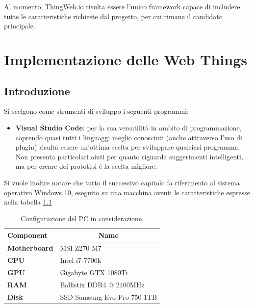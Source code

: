 \documentclass[12pt,a4paper,openright,oneside]{report}
\begin{document}
Al momento, ThingWeb.io risulta essere l'unico framework capace di includere tutte le caratteristiche richieste dal progetto, per cui rimane il candidato principale.


\clearpage{\pagestyle{empty}\cleardoublepage}
\chapter{Implementazione delle Web Things}           %
\lhead[\fancyplain{}{\bfseries\thepage}]{\fancyplain{}{\bfseries\rightmark}}  

\section{Introduzione}

Si scelgono come strumenti di sviluppo i seguenti programmi:

\begin{itemize}
	\item \textbf{Visual Studio Code}: per la sua versatilità in ambito di programmazione, coprendo quasi tutti i linguaggi meglio conosciuti (anche attraverso l'uso di plugin) risulta essere un'ottima scelta per sviluppare qualsiasi programma. Non presenta particolari aiuti per quanto riguarda suggerimenti intelligenti, ma per creare dei prototipi è la scelta migliore.
\end{itemize}

Si vuole inoltre notare che tutto il successivo capitolo fa riferimento al sistema operativo Windows 10, eseguito su una macchina aventi le caratteristiche espresse nella tabella \ref{tab:pc-spec}

\begin{table}[h]
	\centering
	\begin{tabular}{|l|l|}
		\hline
		\textbf{Component}   & \multicolumn{1}{c|}{\textbf{Name}} \\ \hline
		\textbf{Motherboard} & MSI Z270 M7                        \\ \hline
		\textbf{CPU}         & Intel i7-7700k                     \\ \hline
		\textbf{GPU}         & Gigabyte GTX 1080Ti                \\ \hline
		\textbf{RAM}         & Ballistix DDR4 @ 2400MHz           \\ \hline
		\textbf{Disk}        & SSD Samsung Evo Pro 750 1TB                \\ \hline
	\end{tabular}
	\caption{\label{tab:pc-spec} Configurazione del PC in considerazione.}
\end{table}
\end{document}
